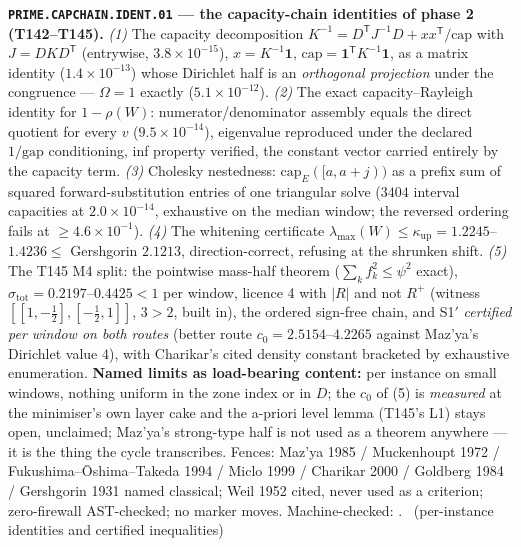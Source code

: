 \par\smallskip\noindent\textbf{\texttt{PRIME.CAPCHAIN.IDENT.01} --- the
capacity-chain identities of phase 2 (T142--T145).}
\emph{(1)} The capacity decomposition
$K^{-1}=D^{\mathsf T}J^{-1}D+xx^{\mathsf T}/\mathrm{cap}$ with
$J=DKD^{\mathsf T}$ (entrywise, $3.8\times10^{-15}$), $x=K^{-1}\mathbf 1$,
$\mathrm{cap}=\mathbf 1^{\mathsf T}K^{-1}\mathbf 1$, as a matrix identity
($1.4\times10^{-13}$) whose Dirichlet half is an \emph{orthogonal projection}
under the congruence --- $\Omega=1$ exactly ($5.1\times10^{-12}$). \emph{(2)} The
exact capacity--Rayleigh identity for $1-\rho(W)$: numerator/denominator
assembly equals the direct quotient for every $v$ ($9.5\times10^{-14}$),
eigenvalue reproduced under the declared $1/\mathrm{gap}$ conditioning, inf
property verified, the constant vector carried entirely by the capacity term.
\emph{(3)} Cholesky nestedness: $\mathrm{cap}_E([a,a{+}j))$ as a prefix sum of
squared forward-substitution entries of one triangular solve ($3404$ interval
capacities at $2.0\times10^{-14}$, exhaustive on the median window; the reversed
ordering fails at $\ge4.6\times10^{-1}$). \emph{(4)} The whitening certificate
$\lambda_{\max}(W)\le\kappa_{\mathrm{up}}=1.2245$--$1.4236\le$ Gershgorin
$2.1213$, direction-correct, refusing at the shrunken shift. \emph{(5)} The T145
M4 split: the pointwise mass-half theorem ($\sum_kf_k^2\le\psi^2$ exact),
$\sigma_{\mathrm{tot}}=0.2197$--$0.4425<1$ per window, licence 4 with $|R|$ and
not $R^{+}$ (witness $[[1,-\tfrac12],[-\tfrac12,1]]$, $3>2$, built in), the
ordered sign-free chain, and S1$'$ \emph{certified per window on both routes}
(better route $c_0=2.5154$--$4.2265$ against Maz'ya's Dirichlet value $4$), with
Charikar's cited density constant bracketed by exhaustive enumeration.
\textbf{Named limits as load-bearing content:} per instance on small windows,
nothing uniform in the zone index or in $D$; the $c_0$ of (5) is
\emph{measured} at the minimiser's own layer cake and the a-priori level lemma
(T145's L1) stays open, unclaimed; Maz'ya's strong-type half is not used as a
theorem anywhere --- it is the thing the cycle transcribes. Fences: Maz'ya 1985 /
Muckenhoupt 1972 / Fukushima--\=Oshima--Takeda 1994 / Miclo 1999 / Charikar
2000 / Goldberg 1984 / Gershgorin 1931 named classical; Weil 1952 cited, never
used as a criterion; zero-firewall AST-checked; no marker moves.
Machine-checked: .
\mE\ (per-instance identities and certified inequalities)


